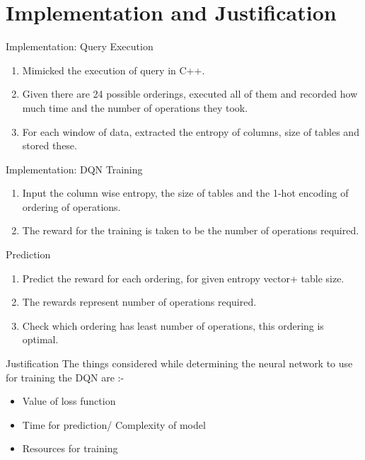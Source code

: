
\section{Implementation and Justification}
\frame{\sectionpage}


\begin{frame}{Implementation: Query Execution}
    \begin{enumerate}
        \item Mimicked the execution of query in C++.
        \item Given there are 24 possible orderings, executed all of them and recorded how much time and the number of operations they took.
        \item For each window of data, extracted the entropy of columns, size of tables and stored these.
    \end{enumerate}
\end{frame}

\begin{frame}{Implementation: DQN}
    Training
    \begin{enumerate}
        \item Input the column wise entropy, the size of tables and the 1-hot encoding of ordering of operations.
        \item The reward for the training is taken to be the number of operations required.
    \end{enumerate}
    Prediction
    \begin{enumerate}
        \item Predict the reward for each ordering, for given entropy vector+ table size.\\
        \item The rewards represent number of operations required.
        \item Check which ordering has least number of operations, this ordering is optimal.
    \end{enumerate}
\end{frame}

\begin{frame}{Justification}
The things considered while determining the neural network to use for training the DQN are :-
    \begin{itemize}
        \item Value of loss function
        \item Time for prediction/ Complexity of model
        \item Resources for training
    \end{itemize}
\end{frame}


